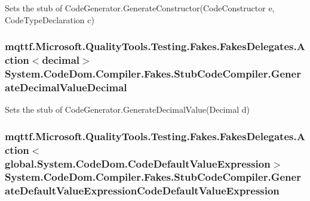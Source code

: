 Sets the stub of Code\-Generator.\-Generate\-Constructor(\-Code\-Constructor e, Code\-Type\-Declaration c)

\hypertarget{class_system_1_1_code_dom_1_1_compiler_1_1_fakes_1_1_stub_code_compiler_aec8c1edca2c5eb68a465966042f12602}{
\subsubsection[{Generate\-Decimal\-Value\-Decimal}]{\setlength{\rightskip}{0pt plus 5cm}mqttf.\-Microsoft.\-Quality\-Tools.\-Testing.\-Fakes.\-Fakes\-Delegates.\-Action$<$decimal$>$ System.\-Code\-Dom.\-Compiler.\-Fakes.\-Stub\-Code\-Compiler.\-Generate\-Decimal\-Value\-Decimal}}\label{class_system_1_1_code_dom_1_1_compiler_1_1_fakes_1_1_stub_code_compiler_aec8c1edca2c5eb68a465966042f12602}


Sets the stub of Code\-Generator.\-Generate\-Decimal\-Value(\-Decimal d)

\hypertarget{class_system_1_1_code_dom_1_1_compiler_1_1_fakes_1_1_stub_code_compiler_ace9cbbc899b552d4098e0e5ca613ca2b}{
\subsubsection[{Generate\-Default\-Value\-Expression\-Code\-Default\-Value\-Expression}]{\setlength{\rightskip}{0pt plus 5cm}mqttf.\-Microsoft.\-Quality\-Tools.\-Testing.\-Fakes.\-Fakes\-Delegates.\-Action$<$global.\-System.\-Code\-Dom.\-Code\-Default\-Value\-Expression$>$ System.\-Code\-Dom.\-Compiler.\-Fakes.\-Stub\-Code\-Compiler.\-Generate\-Default\-Value\-Expression\-Code\-Default\-Value\-Expression}}\label{class_system_1_1_code_dom_1_1_compiler_1_1_fakes_1_1_stub_code_compiler_ace9cbbc899b552d4098e0e5ca613ca2b}


